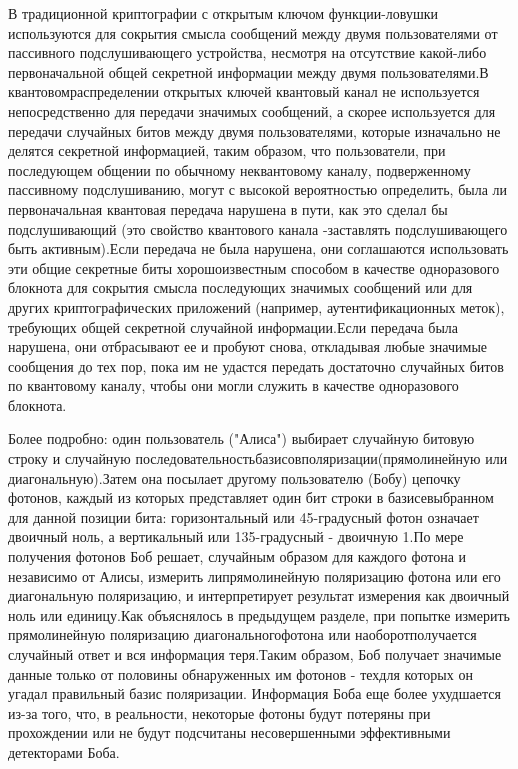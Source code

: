 ­­­­­­­­­­В традиционной криптографии с открытым ключом функции-ловушки используются для сокрытия смысла сообщений между двумя пользователями от пассивного подслушивающего устройства, несмотря на отсутствие какой-либо первоначальной общей секретной информации между двумя пользователями.В квантовомраспределении открытых ключей квантовый канал не используется непосредственно для передачи значимых сообщений, а скорее используется для передачи случайных битов между двумя пользователями, которые изначально не делятся секретной информацией, таким образом, что пользователи, при последующем общении по обычному неквантовому каналу, подверженному пассивному подслушиванию, могут с высокой вероятностью определить, была ли первоначальная квантовая передача нарушена в пути, как это сделал бы подслушивающий (это свойство квантового канала -заставлять подслушивающего быть активным).Если передача не была нарушена, они соглашаются использовать эти общие секретные биты хорошоизвестным способом в качестве одноразового блокнота для сокрытия смысла последующих значимых сообщений или для других криптографических приложений (например, аутентификационных меток), требующих общей секретной случайной информации.Если передача была нарушена, они отбрасывают ее и пробуют снова, откладывая любые значимые сообщения до тех пор, пока им не удастся передать достаточно случайных битов по квантовому каналу, чтобы они могли служить в качестве одноразового блокнота.

­­­­­­­Более подробно: один пользователь ("Алиса") выбирает случайную битовую строку и случайную последовательностьбазисовполяризации(прямолинейную или диагональную).Затем она посылает другому пользователю (Бобу) цепочку фотонов, каждый из которых представляет один бит строки в базисевыбранном для данной позиции бита: горизонтальный или 45-градусный фотон означает двоичный ноль, а вертикальный или 135-градусный - двоичную 1.По мере получения фотонов Боб решает, случайным образом для каждого фотона и независимо от Алисы, измерить липрямолинейную поляризацию фотона или его диагональную поляризацию, и интерпретирует результат измерения как двоичный ноль или единицу.Как объяснялось в предыдущем разделе, при попытке измерить прямолинейную поляризацию диагональногофотона или наоборотполучается случайный ответ и вся информация теря.Таким образом, Боб получает значимые данные только от половины обнаруженных им фотонов - техдля которых он угадал правильный базис поляризации. Информация Боба еще более ухудшается из-за того, что, в реальности, некоторые фотоны будут потеряны при прохождении или не будут подсчитаны несовершенными эффективными детекторами Боба.

